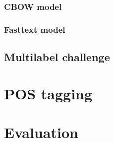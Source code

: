\subsubsection{CBOW model}

\subsubsection{Fasttext model}

\subsection{Multilabel challenge}

\section{POS tagging} %
\label{sec:}


\section{Evaluation} %
\label{sec:evaluation}


